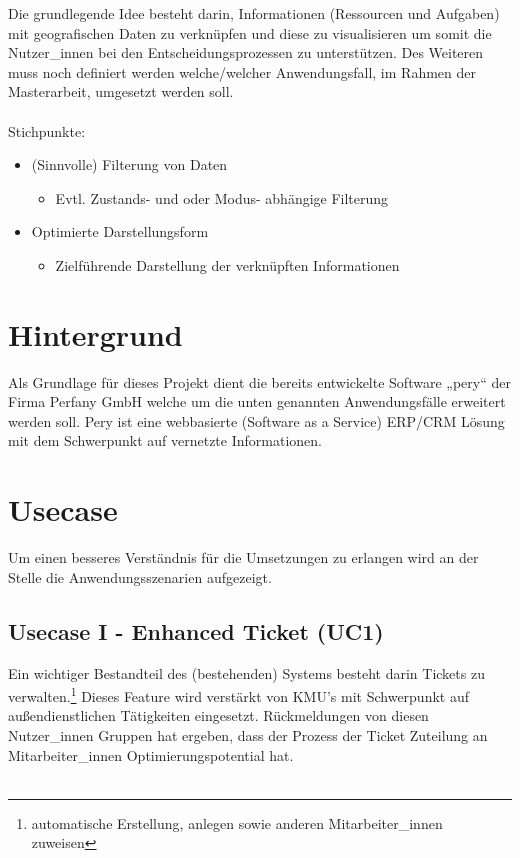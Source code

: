 \documentclass[Bachelorarbeit.tex]{subfiles}
\begin{document}
Die grundlegende Idee besteht darin, Informationen (Ressourcen und Aufgaben) mit geografischen Daten zu verknüpfen und diese zu visualisieren um somit die Nutzer\_innen bei den Entscheidungsprozessen zu unterstützen. Des Weiteren muss noch definiert werden welche/welcher Anwendungsfall, im Rahmen der Masterarbeit, umgesetzt werden soll.\\
\\
Stichpunkte:
\begin{itemize}
\item (Sinnvolle) Filterung von Daten
\begin{itemize}
	\item Evtl. Zustands- und oder Modus- abhängige Filterung
\end{itemize}
\item Optimierte Darstellungsform
\begin{itemize}
	\item Zielführende Darstellung der verknüpften Informationen
\end{itemize}
\end{itemize}

\section{Hintergrund}
\label{chap:einfuehrung:sec:hintergrund}
Als Grundlage für dieses Projekt dient die bereits entwickelte Software „pery“ der Firma Perfany GmbH welche um die unten genannten Anwendungsfälle erweitert werden soll. Pery ist eine webbasierte (Software as a Service) ERP/CRM Lösung mit dem Schwerpunkt auf vernetzte Informationen. 

\section{Usecase}

Um einen besseres Verständnis für die Umsetzungen zu erlangen wird an der Stelle die Anwendungsszenarien aufgezeigt.



\subsection{Usecase I - Enhanced Ticket (\ac{UC}1)}
Ein wichtiger Bestandteil des (bestehenden) Systems besteht darin Tickets zu verwalten.\footnote{automatische Erstellung, anlegen sowie anderen Mitarbeiter\_innen zuweisen}
Dieses Feature wird verstärkt von \ac{KMU}’s mit Schwerpunkt auf außendienstlichen Tätigkeiten eingesetzt. 
Rückmeldungen von diesen Nutzer\_innen Gruppen hat ergeben, dass der Prozess der Ticket Zuteilung an Mitarbeiter\_innen Optimierungspotential hat. \\
\\
\end{document}
